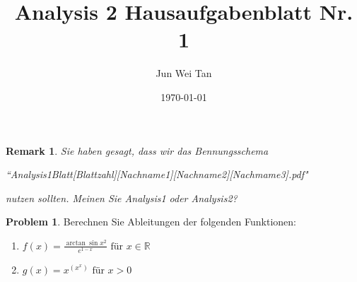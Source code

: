 \documentclass[prb,12pt]{revtex4-2}
\newtheorem{Remark}[Theorem]{Remark}
\theoremstyle{definition}
\newtheorem{Problem}{Problem}
\theoremstyle{definition}
\newenvironment{parts}{\begin{enumerate}[label=(\alph*)]}{\end{enumerate}}
\newcommand{\R}{\mathbb{R}}
\begin{document}
	\title{Analysis 2 Hausaufgabenblatt Nr. 1}
	\author{Jun Wei Tan}
	\date{\today}
	\maketitle
	\begin{Remark}
		Sie haben gesagt, dass wir das Bennungsschema 

		``Analysis1Blatt[Blattzahl][Nachname1][Nachname2][Nachmame3].pdf"

		nutzen sollten. Meinen Sie Analysis1 oder Analysis2? 
	\end{Remark}
\begin{Problem}
Berechnen Sie Ableitungen der folgenden Funktionen:
\begin{parts}
	\item $f(x)=\frac{\arctan\sin x^2}{e^{1-x}}\text{ f\"{u}r }x\in \R$ 
	\item $g(x)=x^{(x^x)}\text{ f\"{u}r }x>0$
\end{parts}
\end{Problem}
\end{document}
